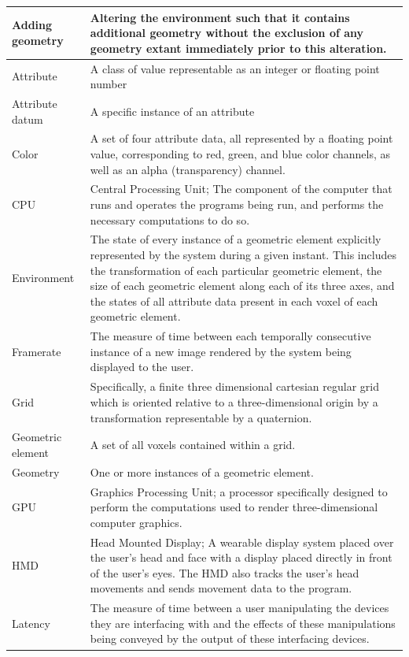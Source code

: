 \documentclass[onecolumn, draftclsnofoot,10pt, compsoc]{IEEEtran}
\begin{document}
\begin{longtable}{ | l | p{12cm} | }
 \hline			
Adding geometry & Altering the environment such that it contains additional geometry without the exclusion of any geometry extant immediately prior to this alteration.  \\ \hline 
Attribute & A class of value representable as an integer or floating point number  \\ \hline
Attribute datum & A specific instance of an attribute  \\ \hline
Color & A set of four attribute data, all represented by a floating point value, corresponding to red, green, and blue color channels, as well as an alpha (transparency) channel.  \\ \hline
CPU & Central Processing Unit; The component of the computer that runs and operates the programs being run, and performs the necessary computations to do so.  \\ \hline
Environment & The state of every instance of a geometric element explicitly represented by the system during a given instant. This includes the transformation of each particular geometric element, the size of each geometric element along each of its three axes, and the states of all attribute data present in each voxel of each geometric element. \\ \hline
Framerate & The measure of time between each temporally consecutive instance of a new image rendered by the system being displayed to the user. \\ \hline 
Grid &  Specifically, a finite three dimensional cartesian regular grid which is oriented relative to a three-dimensional origin by a transformation representable by a quaternion. \\ \hline
Geometric element & A set of all voxels contained within a grid.  \\ \hline
Geometry & One or more instances of a geometric element.  \\ \hline
GPU & Graphics Processing Unit; a processor specifically designed to perform the computations used to render three-dimensional computer graphics.  \\ \hline
HMD & Head Mounted Display; A wearable display system placed over the user’s head and face with a display placed directly in front of the user’s eyes. The HMD also tracks the user’s head movements and sends movement data to the program.  \\ \hline
Latency & The measure of time between a user manipulating the devices they are interfacing with and the effects of these manipulations being conveyed by the output of these interfacing devices. \\ \hline

\end{longtable}
\end{document}
